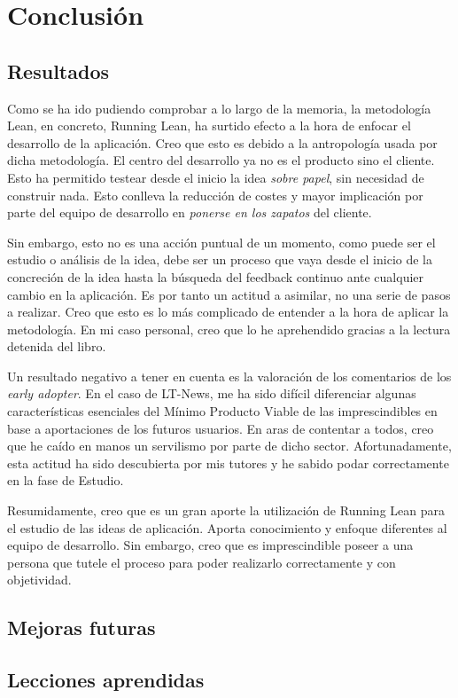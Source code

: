 
\chapter{Conclusión}\label{conclusion}

\section{Resultados}\label{sec:resultados}

Como se ha ido pudiendo comprobar a lo largo de la memoria, la metodología Lean, en concreto, Running Lean, ha surtido efecto a la hora de enfocar el desarrollo de la aplicación. Creo que esto es debido a la antropología usada por dicha metodología. El centro del desarrollo ya no es el producto sino el cliente. Esto ha permitido testear desde el inicio la idea \textit{sobre papel}, sin necesidad de construir nada. Esto conlleva la reducción de costes y mayor implicación por parte del equipo de desarrollo en \textit{ponerse en los zapatos} del cliente.

Sin embargo, esto no es una acción puntual de un momento, como puede ser el estudio o análisis de la idea, debe ser un proceso que vaya desde el inicio de la concreción de la idea hasta la búsqueda del feedback continuo ante cualquier cambio en la aplicación. Es por tanto un actitud a asimilar, no una serie de pasos a realizar. Creo que esto es lo más complicado de entender a la hora de aplicar la metodología. En mi caso personal, creo que lo he aprehendido gracias a la lectura detenida del libro.

Un resultado negativo a tener en cuenta es la valoración de los comentarios de los \textit{early adopter}. En el caso de LT-News, me ha sido difícil diferenciar algunas características esenciales del Mínimo Producto Viable de las imprescindibles en base a aportaciones de los futuros usuarios. En aras de contentar a todos, creo que he caído en manos un servilismo por parte de dicho sector. Afortunadamente, esta actitud ha sido descubierta por mis tutores y he sabido podar correctamente en la fase de Estudio.

Resumidamente, creo que es un gran aporte la utilización de Running Lean para el estudio de las ideas de aplicación. Aporta conocimiento y enfoque diferentes al equipo de desarrollo. Sin embargo, creo que es imprescindible poseer a una persona que tutele el proceso para poder realizarlo correctamente y con objetividad.

\section{Mejoras futuras}\label{sec:mejoras_futuras}

\section{Lecciones aprendidas}\label{sec:lecciones_aprendidas}
